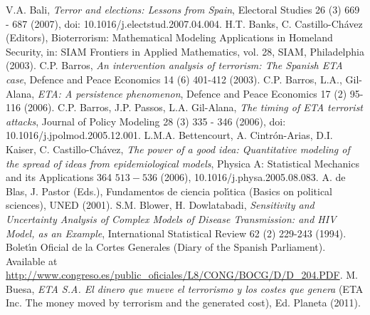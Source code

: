 \documentclass[12pt,a4paper]{report}
\begin{document}
\begin{thebibliography}{99}
 V.A. Bali, \textit{Terror and elections: Lessons from Spain}, Electoral Studies 26 (3) 669 - 687 (2007), doi: 10.1016/j.electstud.2007.04.004.
 H.T. Banks, C. Castillo-Ch\'{a}vez (Editors), Bioterrorism: Mathematical Modeling Applications in Homeland Security, in: SIAM Frontiers in Applied Mathematics, vol. 28, SIAM, Philadelphia (2003).
 C.P. Barros, \textit{An intervention analysis of terrorism: The Spanish ETA case}, Defence and Peace Economics 14 (6) 401-412 (2003).
 C.P. Barros, L.A., Gil-Alana, \textit{ETA: A persistence phenomenon}, Defence and Peace Economics 17 (2) 95-116 (2006).
 C.P. Barros, J.P. Passos, L.A. Gil-Alana, \textit{The timing of ETA terrorist attacks}, Journal of Policy Modeling 28 (3) 335 - 346 (2006), doi: 10.1016/j.jpolmod.2005.12.001.
 L.M.A. Bettencourt, A. Cintr\'{o}n-Arias, D.I. Kaiser, C. Castillo-Ch\'{a}vez, \textit{The power of a good idea: Quantitative modeling of the spread of ideas from epidemiological models}, Physica A: Statistical Mechanics and its Applications 364 $513-536$ (2006), 10.1016/j.physa.2005.08.083.
  A. de Blas, J. Pastor (Eds.), Fundamentos de ciencia pol\'{\i}tica (Basics on political sciences), UNED (2001).
 S.M. Blower, H. Dowlatabadi, \textit{Sensitivity and Uncertainty Analysis of Complex Models of Disease Transmission: and HIV Model, as an Example}, International Statistical Review 62 (2) 229-243 (1994).
 Bolet\'{\i}n Oficial de la Cortes Generales (Diary of the Spanish Parliament). Available at \url{http://www.congreso.es/public_oficiales/L8/CONG/BOCG/D/D_204.PDF}. 
 M. Buesa, \textit{ETA S.A. El dinero que mueve el terrorismo y los costes que genera} (ETA Inc. The money moved by terrorism and the generated cost), Ed. Planeta (2011).


\end{thebibliography}
\end{document}

